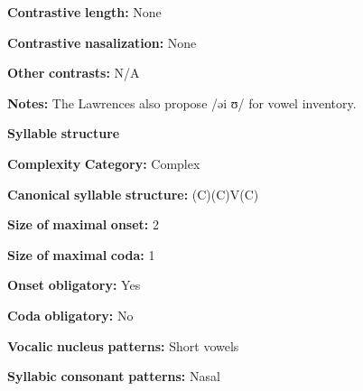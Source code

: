 \begin{styleBody}
\textbf{Contrastive} \textbf{length:} None
\end{styleBody}

\begin{styleBody}
\textbf{Contrastive} \textbf{nasalization:} None
\end{styleBody}

\begin{styleBody}
\textbf{Other} \textbf{contrasts:} N/A
\end{styleBody}

\begin{styleBody}
\textbf{Notes:} The Lawrences also propose /əi ʊ/ for vowel inventory.
\end{styleBody}

\begin{styleBody}
\textbf{Syllable} \textbf{structure}
\end{styleBody}

\begin{styleBody}
\textbf{Complexity} \textbf{Category:} Complex
\end{styleBody}

\begin{styleBody}
\textbf{Canonical} \textbf{syllable} \textbf{structure:} (C)(C)V(C) \citep[63-73]{Loughnane2009}
\end{styleBody}

\begin{styleBody}
\textbf{Size} \textbf{of} \textbf{maximal} \textbf{onset:} 2
\end{styleBody}

\begin{styleBody}
\textbf{Size} \textbf{of} \textbf{maximal} \textbf{coda:} 1
\end{styleBody}

\begin{styleBody}
\textbf{Onset} \textbf{obligatory:} Yes
\end{styleBody}

\begin{styleBody}
\textbf{Coda} \textbf{obligatory:} No
\end{styleBody}

\begin{styleBody}
\textbf{Vocalic} \textbf{nucleus} \textbf{patterns:} Short vowels
\end{styleBody}

\begin{styleBody}
\textbf{Syllabic} \textbf{consonant} \textbf{patterns:} Nasal
\end{styleBody}

